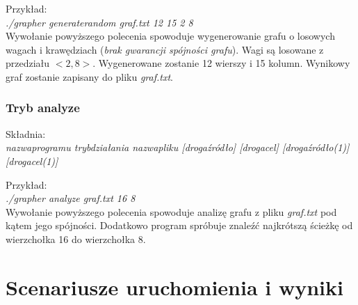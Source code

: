 \documentclass{article}
\begin{document}
\medskip

\noindent Przykład:\\
\textit{./grapher generate\textunderscore random graf.txt 12 15 2 8}\\
Wywołanie powyższego polecenia spowoduje wygenerowanie grafu o losowych wagach i krawędziach (\emph{brak gwarancji spójności grafu}). Wagi są losowane z przedziału $<2, 8>$. Wygenerowane zostanie 12 wierszy i 15 kolumn. Wynikowy graf zostanie zapisany do pliku \emph{graf.txt}.

\newpage

\subsubsection{Tryb analyze}
Składnia:\\
\textit{nazwa\textunderscore programu tryb\textunderscore działania nazwa\textunderscore pliku  [droga\textunderscore źródło] [droga\textunderscore cel] [droga\textunderscore źródło(1)] [droga\textunderscore cel(1)]}

\medskip

\noindent Przykład:\\
\textit{./grapher analyze graf.txt 16 8}\\
Wywołanie powyższego polecenia spowoduje analizę grafu z pliku \emph{graf.txt} pod kątem jego spójności. Dodatkowo program spróbuje znaleźć najkrótszą ścieżkę od wierzchołka 16 do wierzchołka 8.
\section{Scenariusze uruchomienia i wyniki}
\end{document}
